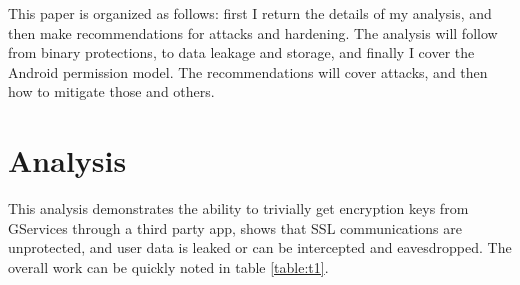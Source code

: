 \documentclass[conference,compsoc]{IEEEtran}
\begin{document}
This paper is organized as follows: first I return the details of my analysis, and then make recommendations for attacks and hardening. The analysis will follow from binary protections, to data leakage and storage, and finally I cover the Android permission model. The recommendations will cover attacks, and then how to mitigate those and others.

\section{Analysis}
This analysis demonstrates the ability to trivially get encryption keys from GServices through a third party app, shows that SSL communications are unprotected, and user data is leaked or can be intercepted and eavesdropped. The overall work can be quickly noted in table \ref{table:t1}.
\end{document}
